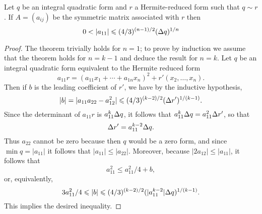\begin{theoremx}
  {\normalfont \cite[p.~59ff]{jones1950arithmetic}} Let \(q\) be an integral
  quadratic form and \(r\) a Hermite-reduced form such that \(q \sim r\). If \(A
  = (a_{ij})\) be the symmetric matrix associated with \(r\) then
  \[
    0 < |a_{11}| \leqslant (4/3)^{(n-1)/2} ({{\Delta} q})^{1/n}
  \]
  \label{thm:bound-on-minimum-hermite}
\end{theoremx}

\begin{proof}
  The theorem trivially holds for \(n = 1\); to prove by induction we assume
  that the theorem holds for \(n = k - 1\) and deduce the result for \(n = k\).
  Let \(q\) be an integral quadratic form equivalent to the Hermite reduced form
  \[
    a_{11} r = (a_{11}x_1 + \cdots + a_{1n}x_n)^2 + r'(x_2, \dots, x_n).
  \]
  Then if \(b\) is the leading coefficient of \(r'\), we have by the inductive
  hypothesis,
  \[
    |b| = |a_{11}a_{22} - a_{12}^2| \leqslant (4/3)^{(k-2)/2} ({{\Delta} r'})^{1/(k-1)}.
  \]
  Since the determinant of \(a_{11} r\) is \(a_{11}^k {\Delta} q\), it follows
  that \(a_{11}^k {\Delta} q = a_{11}^2 {\Delta} r'\), so that \[{\Delta} r' =
  a_{11}^{k-2} {\Delta} q.\] Thus \(a_{22}\) cannot be zero because then \(q\)
  would be a zero form, and since \(\min q = |a_{11}|\) it follows that
  \(|a_{11}| \leq |a_{22}|\). Moreover, because \(|2a_{12}| \leq |a_{11}|\), it
  follows that
  \[
    a_{11}^2 \leq a_{11}^2/4 + b,
  \]
  or, equivalently,
  \[
    3a_{11}^2/4 \leqslant |b| \leqslant (4/3)^{(k-2)/2} (|a^{k-2}_{11}| {\Delta} q)^{1/(k-1)}.
  \]
  This implies the desired inequality.
\end{proof}